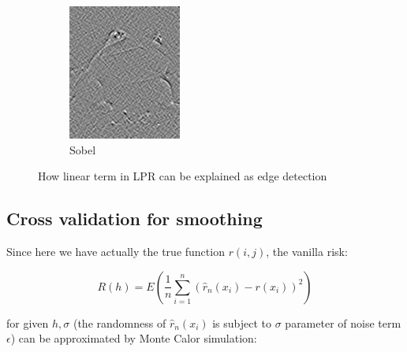 \documentclass{article}
\begin{document}
\begin{figure}[htb]
\begin{subfigure}[b]{0.24\linewidth}
    \includegraphics[width=\linewidth]{images/edge_4.png}
    \caption{Sobel}
  \end{subfigure}
  \caption{How linear term in LPR can be explained as edge detection}
  \label{fig:edge}
\end{figure}



\subsection{Cross validation for smoothing}


Since here we have actually the true function $r(i,j)$, the vanilla risk:

$$
R(h) = E \left( \frac{1}{n}\sum_{i=1}^n(\hat{r}_n(x_i)-r(x_i))^2 \right)
$$

for given $h,\sigma$ (the randomness of $\hat{r}_n(x_i)$ is subject to $\sigma$ parameter of noise term $\epsilon$) 
can be approximated by Monte Calor simulation:
\end{document}
